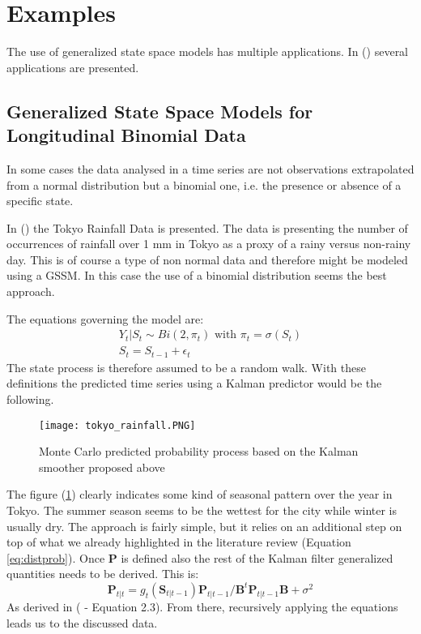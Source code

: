 \section{Examples}
\justify
The use of generalized state space models has multiple applications. In (\cite{song2007correlated}) several applications are presented.

\subsection{Generalized State Space Models for Longitudinal Binomial Data}
In some cases the data analysed in a time series are not observations extrapolated from a normal distribution but a binomial one, i.e. the presence or absence of a specific state.

In (\cite{kitagawa1987}) the Tokyo Rainfall Data is presented. The data is presenting the number of occurrences of rainfall over 1 mm in Tokyo as a proxy of a rainy versus non-rainy day. This is of course a type of non normal data and therefore might be modeled using a GSSM. In this case the use of a binomial distribution seems the best approach.
\par \vspace{5mm}
The equations governing the model are:
\begin{equation}
    \begin{gathered}
        Y_t|S_t \sim Bi(2, \pi_t) \text{ with } \pi_t = \sigma(S_t)\\
        S_t = S_{t-1} + \epsilon_t
    \end{gathered}
\end{equation}
The state process is therefore assumed to be a random walk. With these definitions the predicted time series using a Kalman predictor would be the following.

\begin{figure}
    \centering
    \texttt{[image: tokyo\_rainfall.PNG]}
    \caption{Monte Carlo predicted probability process based on the Kalman smoother proposed above}
    \label{fig:rain}
\end{figure}

The figure (\ref{fig:rain}) clearly indicates some kind of seasonal pattern over the year in Tokyo. The summer season seems to be the wettest for the city while winter is usually dry. The approach is fairly simple, but it relies on an additional step on top of what we already highlighted in the literature review (Equation \eqref{eq:distprob}). Once \textbf{P} is defined also the rest of the Kalman filter generalized quantities needs to be derived. This is:
\begin{equation}
    \textbf{P}_{t|t} = g_t(\textbf{S}_{t|t-1})\textbf{P}_{t|t-1}/\textbf{B}^t\textbf{P}_{t|t-1}\textbf{B}+\sigma^2
\end{equation}
As derived in (\cite{kitagawa1987} - Equation 2.3). From there, recursively applying the equations leads us to the discussed data.

